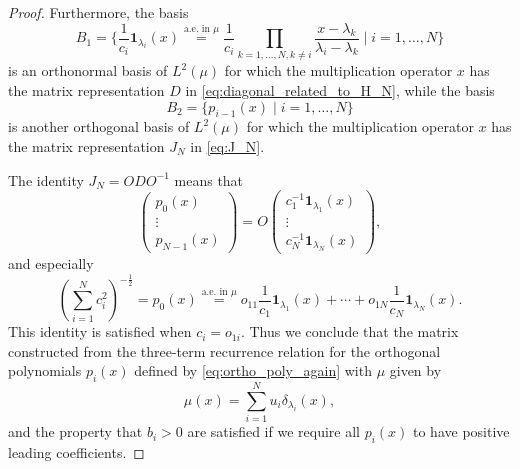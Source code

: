 \documentclass[11pt, a4paper]{article}
\numberwithin{equation}{section}
\newcommand{\id}{\mathbf{1}}
\theoremstyle{definition}
\theoremstyle{remark}
\begin{document}
\begin{proof}
  Furthermore, the basis
  \begin{equation}
    B_1 = \{ \frac{1}{c_i} \id_{\lambda_i}(x) \overset{\text{a.e.\ in $\mu$}}{=} \frac{1}{c_i} \prod_{k = 1, \dotsc, N, k \neq i} \frac{x - \lambda_k}{\lambda_i - \lambda_k} \mid i = 1, \dotsc, N \}
  \end{equation}
  is an orthonormal basis of $L^2(\mu)$ for which the multiplication operator $x$ has the matrix representation $D$ in \eqref{eq:diagonal_related_to_H_N}, while the basis
  \begin{equation}
    B_2 = \{ p_{i - 1}(x) \mid i = 1, \dotsc, N \}
  \end{equation}
  is another orthogonal basis of $L^2(\mu)$ for which the multiplication operator $x$ has the matrix representation $J_N$ in \eqref{eq:J_N}.

  The identity $J_N = O D O^{-1}$ means that
  \begin{equation}
    \begin{pmatrix}
      p_0(x) \\
      \vdots \\
      p_{N - 1}(x)
    \end{pmatrix}
    = O
    \begin{pmatrix}
      c^{-1}_1 \id_{\lambda_1}(x) \\
      \vdots \\
      c^{-1}_N \id_{\lambda_N}(x)
    \end{pmatrix},
  \end{equation}
  and especially
  \begin{equation}
    \left( \sum^N_{i = 1} c^2_i \right)^{-\frac{1}{2}} = p_0(x) \overset{\text{a.e.\ in $\mu$}}{=} o_{11} \frac{1}{c_1} \id_{\lambda_1}(x) + \dotsb + o_{1N} \frac{1}{c_N} \id_{\lambda_N}(x).
  \end{equation}
  This identity is satisfied when $c_i = o_{1i}$. Thus we conclude that the matrix constructed from the three-term recurrence relation for the orthogonal polynomials $p_i(x)$ defined by \eqref{eq:ortho_poly_again} with $\mu$ given by 
  \begin{equation}
    \mu(x) = \sum^N_{i = 1} u_i \delta_{\lambda_i}(x),
  \end{equation}
  and the property that $b_i > 0$ are satisfied if we require all $p_i(x)$ to have positive leading coefficients.
\end{proof}
\end{document}
